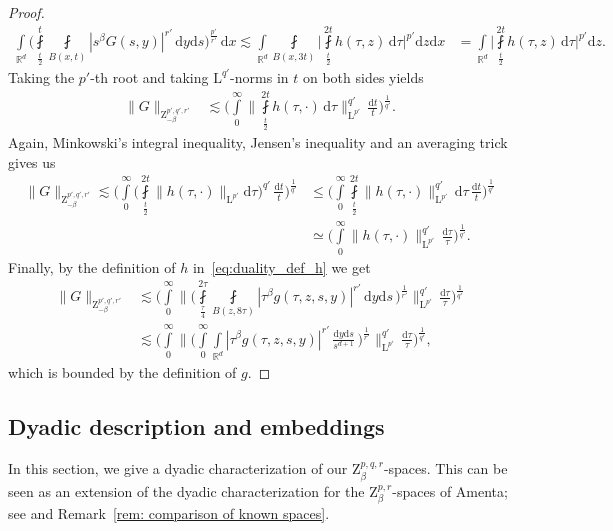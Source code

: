 \documentclass[11pt, leqno,parskip=half]{amsart}
\theoremstyle{definition}
\newcommand{\IR}{\mathbb{R}}
\renewcommand{\L}{\mathrm{L}}
\newcommand{\Z}{\mathrm{Z}}
\renewcommand{\d}{\mathrm{d}}
\numberwithin{equation}{section}
\begin{document}
\begin{proof}
\begin{align*}
        \int\limits_{\IR^d}\bigg(\fint\limits_{\frac{t}{2}}^{t} \fint\limits_{B(x,t)} |s^\beta G(s,y)|^{r'} \,\d y\d s \bigg)^\frac{p'}{r'}\,\d x \lesssim \int\limits_{\IR^d}  \fint\limits_{B(x,3t)} \bigg|\fint\limits_{\frac{t}{2}}^{2t}h(\tau,z)\, \d \tau\bigg|^{p'} \d z  \d x
        &=\int\limits_{\IR^d} \bigg|\fint\limits_{\frac{t}{2}}^{2t}h(\tau,z)\, \d \tau\bigg|^{p'} \d z .
    \end{align*}
    Taking the $p'$-th root and taking $\L^{q'}$-norms in $t$ on both sides yields
    \begin{align*}
        \|G\|_{\Z^{p',q',r'}_{-\beta}} &\lesssim \bigg(\int\limits_0^\infty \bigg\| \fint\limits_{\frac{t}{2}}^{2t}h(\tau,\cdot)\, \d \tau \bigg\|_{\L^{p'}}^{q'}\,\frac{\d t}{t}\bigg)^\frac{1}{q'}.
    \end{align*}
    Again, Minkowski's integral inequality, Jensen's inequality and an averaging trick gives us
    \begin{align*}
        \|G\|_{\Z^{p',q',r'}_{-\beta}}
        \lesssim \bigg(\int\limits_0^\infty \bigg( \fint\limits_{\frac{t}{2}}^{2t} \|h(\tau,\cdot)\|_{\L^{p'}} \d \tau \bigg)^{q'}\,\frac{\d t}{t}\bigg)^\frac{1}{q'}
        &\leq \bigg(\int\limits_0^\infty \fint\limits_{\frac{t}{2}}^{2t} \|h(\tau,\cdot)\|^{q'}_{\L^{p'}} \, \d \tau \,\frac{\d t}{t}\bigg)^\frac{1}{q'}\\
        &\simeq  \bigg(\int\limits_0^\infty  \|h(\tau,\cdot)\|^{q'}_{\L^{p'}}  \,\frac{\d \tau}{\tau}\bigg)^\frac{1}{q'}.
    \end{align*}
    Finally, by the definition of $h$ in~\eqref{eq:duality_def_h} we get
    \begin{align*}
        \|G\|_{\Z^{p',q',r'}_{-\beta}}
        &\lesssim \bigg(\int\limits_0^\infty  \bigg\|\bigg(\fint\limits_{\frac{\tau}{4}}^{2\tau} \fint\limits_{B(z,8\tau)} |\tau^\beta g(\tau, z, s, y)|^{r'} \,\d y\d s  \,\bigg)^\frac{1}{r'} \bigg\|^{q'}_{\L^{p'}}  \,\frac{\d \tau}{\tau}\bigg)^\frac{1}{q'}\\
        &\lesssim \bigg(\int\limits_0^\infty  \bigg\|\bigg(\int\limits_{0}^\infty \int\limits_{\IR^d} |\tau^\beta g(\tau, z, s, y)|^{r'} \,\frac{\d y\d s}{s^{d+1}}  \,\bigg)^\frac{1}{r'} \bigg\|^{q'}_{\L^{p'}}  \,\frac{\d \tau}{\tau}\bigg)^\frac{1}{q'},
    \end{align*}
    which is bounded by the definition of $g$.
\end{proof}

\subsection{Dyadic description and embeddings}
\label{subsec: dyad and emb}
In this section, we give a dyadic characterization of our $\Z^{p,q,r}_\beta$-spaces. This can be seen as an extension of the dyadic characterization for the $\Z^{p,r}_\beta$-spaces of Amenta; see \cites{Amenta2, AA} and Remark~\ref{rem: comparison of known spaces}.
\end{document}

